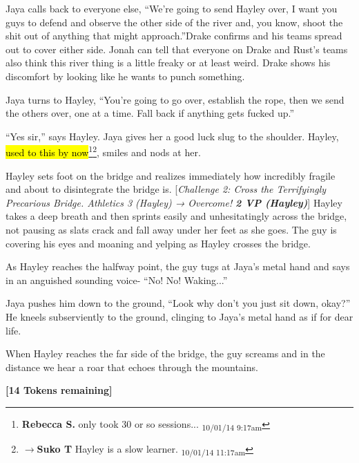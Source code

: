 Jaya calls back to everyone else, ``We're going to send Hayley over, I want you guys to defend and observe the other side of the river and, you know, shoot the shit out of anything that might approach.''Drake confirms and his teams spread out to cover either side.  Jonah can tell that everyone on Drake and Rust's teams also think this river thing is a little freaky or at least weird.  Drake shows his discomfort by looking like he wants to punch something.



Jaya turns to Hayley, ``You're going to go over, establish the rope, then we send the others over, one at a time.  Fall back if anything gets fucked up.''

``Yes sir,'' says Hayley.  Jaya gives her a good luck slug to the shoulder.  Hayley, \hl{used to this by now}\footnote{\textbf{Rebecca S. }only took 30 or so sessions... \textsubscript{10/01/14 9:17am}}\footnote{$\rightarrow$\textbf{Suko T }Hayley is a slow learner. \textsubscript{10/01/14 11:17am}}, smiles and nods at her.

Hayley sets foot on the bridge and realizes immediately how incredibly fragile and about to disintegrate the bridge is.  {[}\textit{Challenge 2: Cross the Terrifyingly Precarious Bridge.  Athletics 3 (Hayley) → Overcome! }\textit{\textbf{2 VP (Hayley)}}{]}  Hayley takes a deep breath and then sprints easily and unhesitatingly across the bridge, not pausing as slats crack and fall away under her feet as she goes.  The guy is covering his eyes and moaning and yelping as Hayley crosses the bridge.

As Hayley reaches the halfway point, the guy tugs at Jaya's metal hand and says in an anguished sounding voice- ``No!  No!  Waking...''

Jaya pushes him down to the ground, ``Look why don't you just sit down, okay?''  He kneels subserviently to the ground, clinging to Jaya's metal hand as if for dear life.

When Hayley reaches the far side of the bridge, the guy screams and in the distance we hear a roar that echoes through the mountains.



\textbf{{[}14 Tokens remaining{]}}





